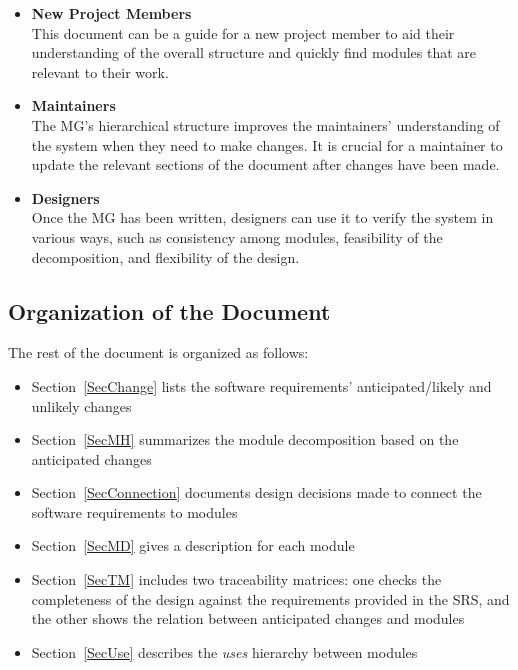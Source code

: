 \begin{itemize}
    \item \textbf{New Project Members} \\
    This document can be a guide for a new project member to aid their
    understanding of the overall structure and quickly find modules that are
    relevant to their work.
    
    \item \textbf{Maintainers} \\
    The MG's hierarchical structure improves the maintainers' understanding of
    the system when they need to make changes. It is crucial for a maintainer
    to update the relevant sections of the document after changes have been
    made.
    
    \item \textbf{Designers} \\
    Once the MG has been written, designers can use it to verify the system in
    various ways, such as consistency among modules, feasibility of the
    decomposition, and flexibility of the design.
\end{itemize}

\subsection{Organization of the Document}
The rest of the document is organized as follows:
\begin{itemize}
    \item Section~\ref{SecChange} lists the software requirements'
    anticipated/likely and unlikely changes

    \item Section~\ref{SecMH} summarizes the module decomposition based on the
    anticipated changes

    \item Section~\ref{SecConnection} documents design decisions made to 
    connect the software requirements to modules

    \item Section~\ref{SecMD} gives a description for each module

    \item Section~\ref{SecTM} includes two traceability matrices: one checks
    the completeness of the design against the requirements provided in the
    SRS, and the other shows the relation between anticipated changes and
    modules

    \item Section~\ref{SecUse} describes the \textit{uses} hierarchy between 
    modules
\end{itemize}